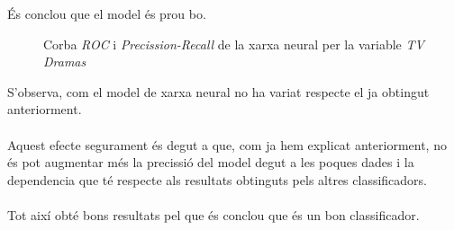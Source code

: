 \documentclass[a4paper, 11pt]{article}
\begin{document}
És conclou que el model és prou bo. 
\newpage 
\begin{figure}[h]
\centering
    \caption{Corba \textit{ROC} i \textit{Precission-Recall} de la xarxa neural per la variable \textit{TV Dramas}}
    \label{fig:my_label}
\end{figure}
\hspace{-1.5em}S'observa, com el model de xarxa neural no ha variat respecte el ja obtingut anteriorment. \\\\
Aquest efecte segurament és degut a que, com ja hem explicat anteriorment, no és pot augmentar més la precissió del model degut a les poques dades i la dependencia que té respecte als resultats obtinguts pels altres classificadors.\\\\
Tot així obté bons resultats pel que és conclou que és un bon classificador.  

\newpage 
\end{document}
